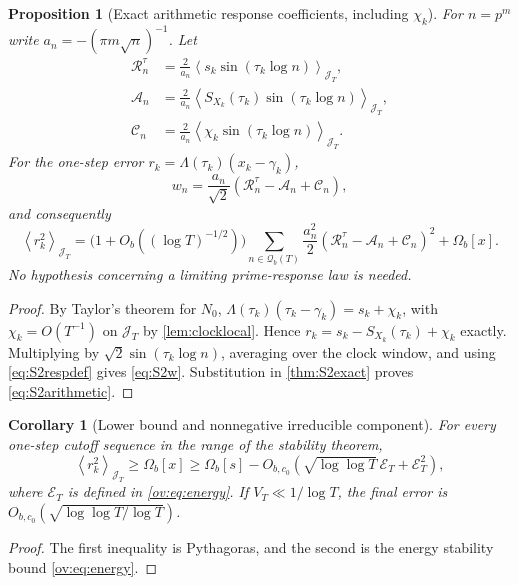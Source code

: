 \documentclass[11pt,reqno]{amsart}
\numberwithin{equation}{section}
\newtheorem{proposition}[theorem]{Proposition}
\newtheorem{corollary}[theorem]{Corollary}
\newcommand{\lamb}{\Lambda}
\newcommand{\avgJ}[1]{\left\langle #1\right\rangle_{\mathcal J_T}}
\begin{document}
\begin{proposition}[Exact arithmetic response coefficients, including $\chi_k$]\label{prop:S2responses}
For $n=p^m$ write $a_n=-(\pi m\sqrt n)^{-1}$. Let
\begin{equation}\label{eq:S2respdef}
\begin{aligned}
\mathcal R_n^{\tau}&=\frac2{a_n}\avgJ{s_k\sin(\tau_k\log n)},\\
\mathcal A_n&=\frac2{a_n}\avgJ{S_{X_k}(\tau_k)\sin(\tau_k\log n)},\\
\mathcal C_n&=\frac2{a_n}\avgJ{\chi_k\sin(\tau_k\log n)}.
\end{aligned}
\end{equation}
For the one-step error $r_k=\lamb(\tau_k)(x_k-\gamma_k)$,
\begin{equation}\label{eq:S2w}
 w_n=\frac{a_n}{\sqrt2}(\mathcal R_n^\tau-\mathcal A_n+\mathcal C_n),
\end{equation}
and consequently
\begin{equation}\label{eq:S2arithmetic}
\avgJ{r_k^2}
=\bigl(1+O_b((\log T)^{-1/2})\bigr)
 \sum_{n\in\mathcal Q_b(T)}\frac{a_n^2}{2}
 (\mathcal R_n^\tau-\mathcal A_n+\mathcal C_n)^2
+\Omega_b[x].
\end{equation}
No hypothesis concerning a limiting prime-response law is needed.
\end{proposition}
\begin{proof}
By Taylor's theorem for $N_0$,
$\lamb(\tau_k)(\tau_k-\gamma_k)=s_k+\chi_k$, with
$\chi_k=O(T^{-1})$ on $\mathcal J_T$ by \cref{lem:clocklocal}.
Hence $r_k=s_k-S_{X_k}(\tau_k)+\chi_k$ exactly.
Multiplying by $\sqrt2\sin(\tau_k\log n)$, averaging over the clock window, and using \eqref{eq:S2respdef} gives \eqref{eq:S2w}.
Substitution in \cref{thm:S2exact} proves \eqref{eq:S2arithmetic}.
\end{proof}

\begin{corollary}[Lower bound and nonnegative irreducible component]\label{cor:S2lower}
For every one-step cutoff sequence in the range of the stability theorem,
\begin{equation}\label{eq:S2lower}
\avgJ{r_k^2}\ge\Omega_b[x]
\ge\Omega_b[s]-O_{b,c_0}(\sqrt{\log\log T}\,\mathcal E_T+\mathcal E_T^2),
\end{equation}
where $\mathcal E_T$ is defined in \eqref{ov:eq:energy}.
If $V_T\ll1/\log T$, the final error is
$O_{b,c_0}(\sqrt{\log\log T/\log T})$.
\end{corollary}
\begin{proof}
The first inequality is Pythagoras, and the second is the energy
stability bound \eqref{ov:eq:energy}.
\end{proof}
\end{document}
